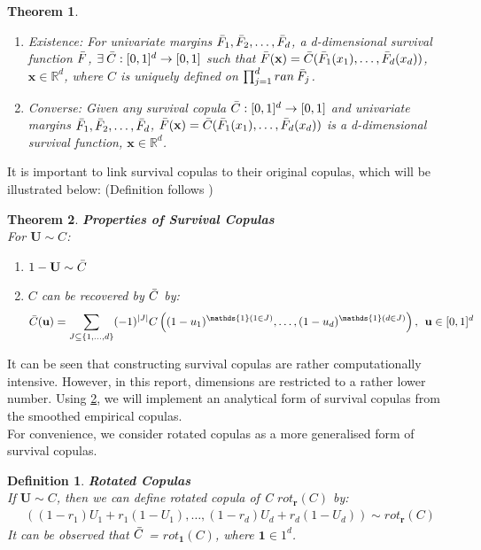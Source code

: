 \documentclass[12pt]{report}
\newtheorem{theorem}{Theorem}[subsection]
\newtheorem{definition}{Definition}[subsection]
\newcommand{\1}{\mathbf{1}}
\begin{document}
\begin{flushleft}
\begin{theorem}
\begin{enumerate}
\item Existence: For univariate margins $\Bar{F}_{1}, \Bar{F}_{2}, \dots, \Bar{F}_{d}$, a d-dimensional survival function $\Bar{F}$, $\exists \: \Bar{C}: [0,1]^{d} \rightarrow [0,1]$ such that $\Bar{F}(\textbf{x}) = \Bar{C}(\Bar{F}_{1}(x_{1}), \dots, \Bar{F}_{d}(x_{d}))$, $\textbf{x} \in \mathbb{R}^{d}$, where $C$ is uniquely defined on $\prod_{j=1}^{d} ran \: \Bar{F}_{j}$.
\item Converse: Given any survival copula $\Bar{C}: [0,1]^{d} \rightarrow [0,1]$ and univariate margins $\Bar{F}_{1}, \Bar{F}_{2}, \dots, \Bar{F}_{d}$, $\Bar{F}(\textbf{x}) = \Bar{C}(\Bar{F}_{1}(x_{1}), \dots, \Bar{F}_{d}(x_{d}))$ is a d-dimensional survival function, $\textbf{x} \in \mathbb{R}^{d}$.
\end{enumerate}
\end{theorem}

It is important to link survival copulas to their original copulas, which will be illustrated below: (Definition follows \cite{HofertBook})

\begin{theorem}\label{SurvivalCopulaProperties}
\textit{\normalfont\parencite{HofertBook}}
\:\textbf{Properties of Survival Copulas} \\
For $\textbf{U} \sim C$:
\begin{enumerate}
\item $1 - \textbf{U} \sim \Bar{C}$
\item $C$ can be recovered by $\Bar{C}$ by:
\begin{align*}
\Bar{C}(\textbf{u}) = \sum\limits_{J \subseteq \{1, \dots, d \} }(-1)^{|J|}C \left( (1 - u_{1})^{\mathds{1}(1\in J)}, \dots, (1 - u_{d})^{\mathds{1}(d\in J)} \right), \: \: \textbf{u} \in [0,1]^{d}
\end{align*}
\end{enumerate}
\end{theorem}

It can be seen that constructing survival copulas are rather computationally intensive. However, in this report, dimensions are restricted to a rather lower number. Using \ref{SurvivalCopulaProperties}, we will implement an analytical form of survival copulas from the smoothed empirical copulas.\\
\vspace{0.5cm}
For convenience, we consider rotated copulas as a more generalised form of survival copulas.

\begin{definition}\label{RotatedCopulaProperties}
\textit{\normalfont\parencite{HofertBook}}
\:\textbf{Rotated Copulas} \\
If $\textbf{U} \sim C$, then we can define rotated copula of C $rot_{\textbf{r}}(C)$ by:
\begin{align*}
\left( (1 - r_{1})U_{1} + r_{1}(1 - U_{1}), \dots, (1 - r_{d})U_{d} + r_{d}(1 - U_{d}) \right) \sim rot_{\textbf{r}}(C)
\end{align*}
It can be observed that $\Bar{C}$ = $rot_{\textbf{1}}(C)$, where $\textbf{1} \in 1^{d}$.
\end{definition}


\end{flushleft}
\end{document}
